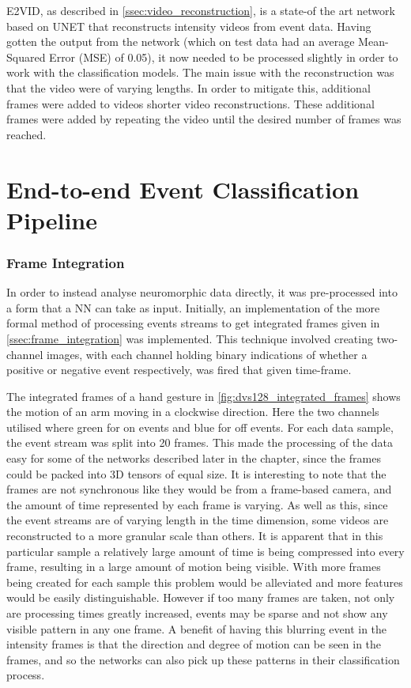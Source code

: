 E2VID, as described in \cref{ssec:video_reconstruction}, is a state-of the art network based on UNET that reconstructs intensity videos from event data. Having gotten the output from the network (which on test data had an average Mean-Squared Error (MSE) of 0.05), it now needed to be processed slightly in order to work with the classification models. The main issue with the reconstruction was that the video were of varying lengths. In order to mitigate this, additional frames were added to videos shorter video reconstructions. These additional frames were added by repeating the video until the desired number of frames was reached.

\section{End-to-end Event Classification Pipeline}

\subsubsection{Frame Integration}

In order to instead analyse neuromorphic data directly, it was pre-processed into a form that a NN can take as input. Initially, an implementation of the more formal method of processing events streams to get integrated frames given in \cref{ssec:frame_integration} was implemented. This technique involved creating two-channel images, with each channel holding binary indications of whether a positive or negative event respectively, was fired that given time-frame.

The integrated frames of a hand gesture in \cref{fig:dvs128_integrated_frames} shows the motion of an arm moving in a clockwise direction. Here the two channels utilised where green for on events and blue for off events. For each data sample, the event stream was split into 20 frames. This made the processing of the data easy for some of the networks described later in the chapter, since the frames could be packed into 3D tensors of equal size. It is interesting to note that the frames are not synchronous like they would be from a frame-based camera, and the amount of time represented by each frame is varying. As well as this, since the event streams are of varying length in the time dimension, some videos are reconstructed to a more granular scale than others. It is apparent that in this particular sample a relatively large amount of time is being compressed into every frame, resulting in a large amount of motion being visible. With more frames being created for each sample this problem would be alleviated and more features would be easily distinguishable. However if too many frames are taken, not only are processing times greatly increased, events may be sparse and not show any visible pattern in any one frame. A benefit of having this blurring event in the intensity frames is that the direction and degree of motion can be seen in the frames, and so the networks can also pick up these patterns in their classification process.

